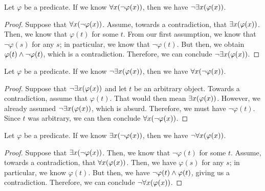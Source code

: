 \newpage

\begin{lemma}\label{lem:forall}
    Let $\varphi$ be a predicate.
    If we know $\forall x \pn*{\neg \varphi(x)}$, then we have $\neg \exists x \pn*{\varphi(x)}$.
\end{lemma}
\begin{proof}
    Suppose that $\forall x \pn*{\neg \varphi(x)}$.
    Assume, towards a contradiction, that $\exists x \pn*{\varphi(x)}$.
    Then, we know that $\varphi(t)$ for some $t$.
    From our first assumption, we know that $\neg \varphi(s)$ for any $s$;
    in particular, we know that $\neg \varphi(t)$.
    But then, we obtain $\varphi(t) \wedge \neg \varphi(t)$, which is a contradiction. \contradiction
    Therefore, we can conclude $\neg \exists x \pn*{\varphi(x)}$.
\end{proof}

\begin{lemma}\label{lem:negexists}
    Let $\varphi$ be a predicate.
    If we know $\neg \exists x \pn*{\varphi(x)}$, then we have $\forall x \pn*{\neg \varphi(x)}$.
\end{lemma}
\begin{proof}
    Suppose that $\neg \exists x \pn*{\varphi(x)}$ and let $t$ be an arbitrary object.
    Towards a contradiction, assume that $\varphi(t)$.
    That would then mean $\exists x \pn*{\varphi(x)}$.
    However, we already assumed $\neg \exists x \pn*{\varphi(x)}$, which is absurd. \contradiction
    Therefore, we must have $\neg \varphi(t)$.
    Since $t$ was arbitrary, we can then conclude $\forall x \pn*{\neg \varphi(x)}$.
\end{proof}

\begin{lemma}\label{lem:exists}
    Let $\varphi$ be a predicate.
    If we know $\exists x \pn*{\neg \varphi(x)}$, then we have $\neg \forall x \pn*{\varphi(x)}$.
\end{lemma}
\begin{proof}
    Suppose that $\exists x \pn*{\neg \varphi(x)}$.
    Then, we know that $\neg \varphi(t)$ for some $t$.
    Assume, towards a contradiction, that $\forall x \pn*{\varphi(x)}$.
    Then, we have $\varphi(s)$ for any $s$;
    in particular, we know $\varphi(t)$.
    But then, we have $\neg \varphi(t) \wedge \varphi(t)$, giving us a contradiction. \contradiction
    Therefore, we can conclude $\neg \forall x \pn*{\varphi(x)}$.
\end{proof}

